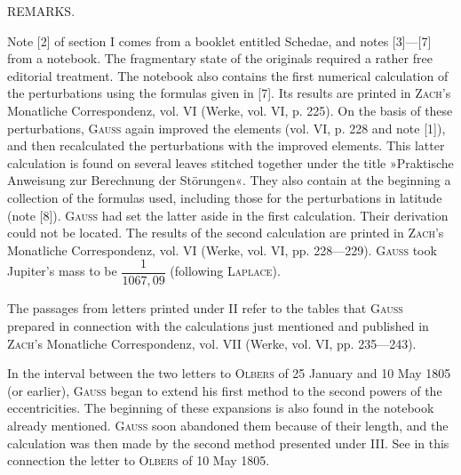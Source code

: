 \par\bigskip{}
\begin{center}REMARKS.\end{center}
\begingroup\small
\noindent\hspace*{\parindent}Note [2] of section I comes from a booklet entitled Schedae, and notes [3]---[7] from a notebook. The fragmentary state of the originals required a rather free editorial treatment. The notebook also contains the first numerical calculation of the perturbations using the formulas given in [7]. Its results are printed in \textsc{Zach}'s Monatliche Correspondenz, vol. VI (Werke, vol. VI, p. 225). On the basis of these perturbations, \textsc{Gauss} again improved the elements (vol. VI, p. 228 and note [1]), and then recalculated the perturbations with the improved elements. This latter calculation is found on several leaves stitched together under the title »Praktische Anweisung zur Berechnung der Störungen«. They also contain at the beginning a collection of the formulas used, including those for the perturbations in latitude (note [8]). \textsc{Gauss} had set the latter aside in the first calculation. Their derivation could not be located. The results of the second calculation are printed in \textsc{Zach}'s Monatliche Correspondenz, vol. VI (Werke, vol. VI, pp. 228---229). \textsc{Gauss} took Jupiter's mass to be \(\dfrac{1}{1067{,}09}\) (following \textsc{Laplace}).

The passages from letters printed under II refer to the tables that \textsc{Gauss} prepared in connection with the calculations just mentioned and published in \textsc{Zach}'s Monatliche Correspondenz, vol. VII (Werke, vol. VI, pp. 235---243).

In the interval between the two letters to \textsc{Olbers} of 25 January and 10 May 1805 (or earlier), \textsc{Gauss} began to extend his first method to the second powers of the eccentricities. The beginning of these expansions is also found in the notebook already mentioned. \textsc{Gauss} soon abandoned them because of their length, and the calculation was then made by the second method presented under III. See in this connection the letter to \textsc{Olbers} of 10 May 1805.

